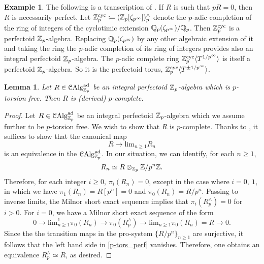 \documentclass[10pt,a4paper]{amsart}
\numberwithin{equation}{subsection}
\newtheorem{lemma}[theorem]{Lemma}
\theoremstyle{definition}
\newtheorem{example}[theorem]{Example}
\def\lim{\mathrm{lim}}
\begin{document}
\begin{example} The following is a transcription of \cite[Example 3.6]{bhatt2018integral}.
    If $R $ is such that $pR = 0$, then $R$ is necessarily perfect. Let $\mathbb Z_p^{\mathrm{cyc}} \coloneqq (\mathbb Z_p[\zeta_{p^\infty}])^\wedge_p$ denote the $p$-adic completion of the ring of integers of the cyclotimic extension $\mathbb Q_p(\zeta_{p^\infty}) / \mathbb Q_p$. Then $\mathbb Z_p^{\mathrm{cyc}}$ is a perfectoid $\mathbb Z_p$-algebra.
    Replacing $\mathbb Q_p(\zeta_{p^\infty})$ by any other algebraic extension of it and taking the ring the $p$-adic completion of its ring of integers provides also an integral perfectoid $\mathbb Z_p$-algebra.
    The $p$-adic complete ring $\mathbb Z_p^{\mathrm{cyc}} \langle T^{1/p^\infty} \rangle$ is itself a perfectoid $\mathbb Z_p$-algebra. So it is the perfectoid torus, $\mathbb Z_p^{\mathrm{cyc}} \langle T^{\pm 1/p^\infty} \rangle$.
\end{example}

\begin{lemma}
    Let $R \in \mathcal C \mathrm{Alg}^{\mathrm{ad}}_{\mathbb Z_p}$ be an integral perfectoid $\mathbb Z_p$-algebra which is $p$-torsion free. Then $R$ is (derived) $p$-complete.
\end{lemma}

\begin{proof}
    Let $R \in \mathcal C \mathrm{Alg}^{\mathrm{ad}}_{\mathbb Z_p}$ be an integral perfectoid $\mathbb Z_p$-algebra which we assume further to be $p$-torsion free. We wish to show that $R$ is $p$-complete. Thanks to \cite[Lemma 8.1.2.3]{lurie2016spectral}, it suffices to show that the canonical map
        \[
            R \to \lim_{n \geq 1} R_n
        \]  
    is an equivalence in the \infcat $\mathcal C \mathrm{Alg}^{\mathrm{ad}}_{\mathbb Z_p}$. In our situation, we can identify, for each $n \geq 1$, 
        \[
            R_n \simeq R \otimes_{\mathbb Z_p} \mathbb Z/ p^n\mathbb Z .
        \]
    Therefore, for each integer $i \geq 0$, $\pi_i(R_n) = 0$, except in the case where $i=0, \ 1$, in which we have $\pi_1(R_n) = R[p^n] =0$ and $\pi_0(R_n) = R/p^n$. Passing to inverse limits, the Milnor short exact sequence implies that $\pi_i(R^\wedge_p) =0$ for $i>0$. For $i=0$, we have a Milnor short exact sequence of the form
        \begin{equation} \label{p-tors_perf}
            0 \to \lim^1_{n \geq 1} \pi_0(R_n) \to \pi_0(R^\wedge_p) \to \lim_{n \geq 1} \pi_0(R_n)= R \to 0.
        \end{equation}
    Since the the transition maps in the pro-system $\{ R/p^n \}_{n \geq 1}$ are surjective, it follows that the left hand side in \eqref{p-tors_perf} vanishes. Therefore, one obtains an equivalence $R^\wedge_p \simeq R$, as desired.
\end{proof}
\end{document}

